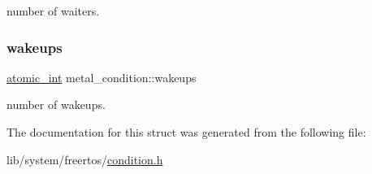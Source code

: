 number of waiters. \mbox{\label{structmetal__condition_a0d86a2776c2ed87e610c15fe9395b0a9}} 
\subsubsection{\texorpdfstring{wakeups}{wakeups}}
{\footnotesize\ttfamily \hyperlink{compiler_2gcc_2atomic_8h_a3584358b6d722cb0cca04ac3cfd8a674}{atomic\+\_\+int} metal\+\_\+condition\+::wakeups}

number of wakeups. 

The documentation for this struct was generated from the following file\+:\begin{DoxyCompactItemize}
\item 
lib/system/freertos/\hyperlink{system_2freertos_2condition_8h}{condition.\+h}\end{DoxyCompactItemize}
